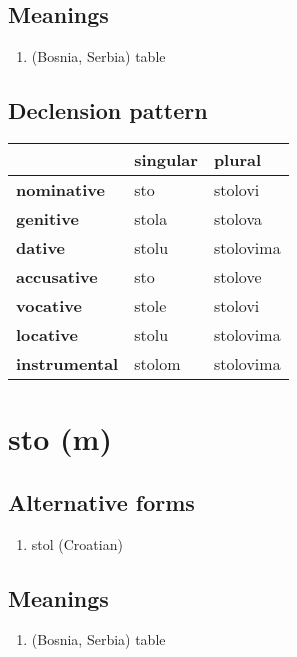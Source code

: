 \subsection*{Meanings}
\begin{enumerate}
\item (Bosnia, Serbia) table
\end{enumerate}
\subsection*{Declension pattern}
\begin{tabularx}{\linewidth}{Xll}
\toprule
{} & singular &     plural \\
\midrule
\textbf{nominative  } &      sto &    stolovi \\
\textbf{genitive    } &    stola &    stolova \\
\textbf{dative      } &    stolu &  stolovima \\
\textbf{accusative  } &      sto &    stolove \\
\textbf{vocative    } &    stole &    stolovi \\
\textbf{locative    } &    stolu &  stolovima \\
\textbf{instrumental} &   stolom &  stolovima \\
\bottomrule
\end{tabularx}

\filbreak
\section{sto (m)}
\subsection*{Alternative forms}
\begin{enumerate}
\item stol (Croatian)
\end{enumerate}
\subsection*{Meanings}
\begin{enumerate}
\item (Bosnia, Serbia) table
\end{enumerate}
